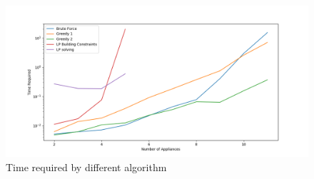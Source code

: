 \begin{figure} 
	\centering
	\includegraphics[width=1\linewidth]{images/opttime}
	\caption[Time required by different algorithm]{Time required by different algorithm}
	\label{fig:opttime}
	\vspace*{-3ex}
\end{figure}
